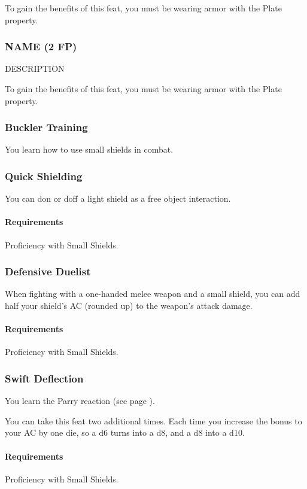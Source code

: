     To gain the benefits of this feat, you must be wearing armor with the Plate property.
\subsubsection{NAME (2 FP)} \label{feat::name}
    DESCRIPTION

    To gain the benefits of this feat, you must be wearing armor with the Plate property.

\subsubsection{Buckler Training} \label{feat::bucklertraining}
    You learn how to use small shields in combat.
\subsubsection{Quick Shielding} \label{feat::quickshielding}
    You can don or doff a light shield as a free object interaction.
    \paragraph{Requirements} Proficiency with Small Shields.
\subsubsection{Defensive Duelist} \label{feat::defensiveduelist}
    When fighting with a one-handed melee weapon and a small shield, you can add half your shield's AC (rounded up) to the weapon's attack damage.
    \paragraph{Requirements} Proficiency with Small Shields.
\subsubsection{Swift Deflection} \label{feat::swiftdeflection}
    You learn the Parry reaction (see page \pageref{act::parry}).

    You can take this feat two additional times.
    Each time you increase the bonus to your AC by one die, so a d6 turns into a d8, and a d8 into a d10.
    \paragraph{Requirements} Proficiency with Small Shields.
